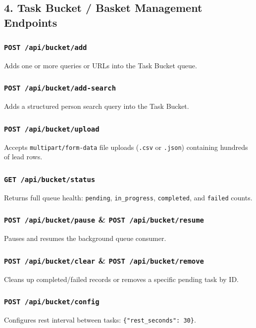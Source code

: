 \documentclass[11pt,a4paper]{report}
\begin{document}
\subsection{4. Task Bucket / Basket Management Endpoints}

\subsubsection{\texttt{POST /api/bucket/add}}
Adds one or more queries or URLs into the Task Bucket queue.

\subsubsection{\texttt{POST /api/bucket/add-search}}
Adds a structured person search query into the Task Bucket.

\subsubsection{\texttt{POST /api/bucket/upload}}
Accepts \texttt{multipart/form-data} file uploads (\texttt{.csv} or \texttt{.json}) containing hundreds of lead rows.

\subsubsection{\texttt{GET /api/bucket/status}}
Returns full queue health: \texttt{pending}, \texttt{in\_progress}, \texttt{completed}, and \texttt{failed} counts.

\subsubsection{\texttt{POST /api/bucket/pause} \& \texttt{POST /api/bucket/resume}}
Pauses and resumes the background queue consumer.

\subsubsection{\texttt{POST /api/bucket/clear} \& \texttt{POST /api/bucket/remove}}
Cleans up completed/failed records or removes a specific pending task by ID.

\subsubsection{\texttt{POST /api/bucket/config}}
Configures rest interval between tasks: \texttt{\{"rest\_seconds": 30\}}.
\end{document}
